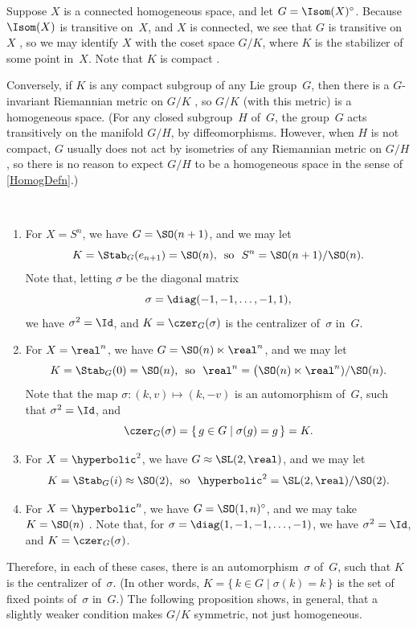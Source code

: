 Suppose $X$ is a connected homogeneous space, and let $G =
\Isom(X)^\circ$. Because $\Isom(X)$ is transitive on~$X$, and $X$ is
connected, we see that $G$ is transitive on~$X$
, so we may identify $X$ with the coset space
$G/K$, where $K$ is the stabilizer of some point in~$X$. Note that
$K$ is compact .

Conversely, if $K$ is any compact subgroup of any Lie group~$G$, then
there is a $G$-invariant Riemannian metric on $G/K$
, so $G/K$ (with this metric) is a homogeneous space.
 (For
any closed subgroup~$H$ of~$G$, the group~$G$ acts transitively on
the manifold $G/H$, by diffeomorphisms. However, when $H$ is not
compact, $G$ usually does not act by isometries of any Riemannian
metric on $G/H$, so there is no reason to expect $G/H$ to be a
homogeneous space in the sense of \cref{HomogDefn}.)

 \begin{eg}  \ 
 \noprelistbreak
 \begin{enumerate}
 
 \item For $X = S^n$, we have $G = \SO(n+1)$, and we may let 
 	$$ \text{$K = \Stab_G(e_{n+1}) = \SO(n)$, \ so \ $S^n = \SO(n+1)/\SO(n)$} .$$
Note that,
letting $\sigma$ be the diagonal matrix 
 $$ \sigma = \diag(-1,-1,\ldots,-1,1) ,$$ we
have $\sigma^2 = \Id$, and
  $K = \czer_G(\sigma)$ is the centralizer of~$\sigma$ in~$G$.
  
 \item For $X = \real^n$, we have $G = \SO(n) \ltimes \real^n$, and
we may let 
	$$ \text{$K = \Stab_G(0) = \SO(n)$, \ so \ $\real^n = \bigl( \SO(n)
\ltimes \real^n)/\SO(n)$} .$$
Note that the map $\sigma \colon (k,v)
\mapsto (k,-v)$ is an automorphism of~$G$, such that $\sigma^2 =
\Id$, and 
 $$ \czer_G(\sigma) = \{\, g \in G \mid \sigma(g) = g \,\} = K .$$
 
 \item For $X = \hyperbolic^2$, we have $G \approx \SL(2,\real)$, and
we may let 
	$$ \text{$K = \Stab_G(i) \approx \SO(2)$, \ so \ 
 $\hyperbolic^2 = \SL(2,\real)/\SO(2)$} .$$
  
 \item For $X = \hyperbolic^n$, we have $G = \SO(1,n)^\circ$, and we
may take $K = \SO(n)$ .  Note that, for
$\sigma = \diag(1,-1,-1,\ldots,-1)$, we have
$\sigma^2 = \Id$, and
  $K = \czer_G(\sigma)$.
 \end{enumerate}
 Therefore, in each of these cases, there is an automorphism~$\sigma$
of~$G$, such that $K$ is the centralizer of~$\sigma$. (In other words,
$K = \{\, k \in G \mid \sigma(k) = k \,\}$ is the set of fixed points of~$\sigma$ in~$G$.) The following
proposition shows, in general, that a slightly weaker condition makes
$G/K$ symmetric, not just homogeneous.
 \end{eg}

